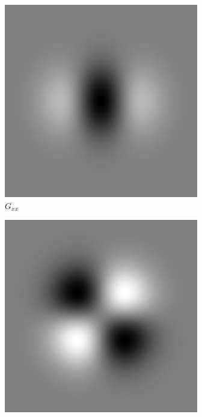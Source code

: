 \documentclass[thesis.tex]{subfiles}
\begin{document}
\begin{figure}[p]
	\begin{subfigure}[t]{0.23\textwidth}
		\includegraphics[width=\textwidth]{img/gaussianDerivative_2_0.png}
		\caption*{$G_{xx}$}
	\end{subfigure}
	\begin{subfigure}[t]{0.23\textwidth}
		\includegraphics[width=\textwidth]{img/gaussianDerivative_1_1.png}

\end{subfigure}
\end{figure}
\end{document}
